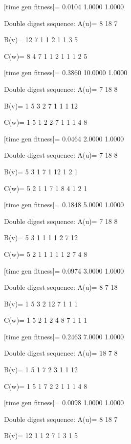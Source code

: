 [time gen fitness]=
    0.0104    1.0000    1.0000

Double digest sequence:
A(u)=
     8    18     7

B(v)=
    12     7     1     1     2     1     1     3     5

C(w)=
     8     4     7     1     1     2     1     1     1     2     5

[time gen fitness]=
    0.3860   10.0000    1.0000

Double digest sequence:
A(u)=
     7    18     8

B(v)=
     1     5     3     2     7     1     1     1    12

C(w)=
     1     5     1     2     2     7     1     1     1     4     8

[time gen fitness]=
    0.0464    2.0000    1.0000

Double digest sequence:
A(u)=
     7    18     8

B(v)=
     5     3     1     7     1    12     1     2     1

C(w)=
     5     2     1     1     7     1     8     4     1     2     1

[time gen fitness]=
    0.1848    5.0000    1.0000

Double digest sequence:
A(u)=
     7    18     8

B(v)=
     5     3     1     1     1     1     2     7    12

C(w)=
     5     2     1     1     1     1     1     2     7     4     8

[time gen fitness]=
    0.0974    3.0000    1.0000

Double digest sequence:
A(u)=
     8     7    18

B(v)=
     1     5     3     2    12     7     1     1     1

C(w)=
     1     5     2     1     2     4     8     7     1     1     1

[time gen fitness]=
    0.2463    7.0000    1.0000

Double digest sequence:
A(u)=
    18     7     8

B(v)=
     1     5     1     7     2     3     1     1    12

C(w)=
     1     5     1     7     2     2     1     1     1     4     8

[time gen fitness]=
    0.0098    1.0000    1.0000

Double digest sequence:
A(u)=
     8    18     7

B(v)=
    12     1     1     2     7     1     3     1     5

